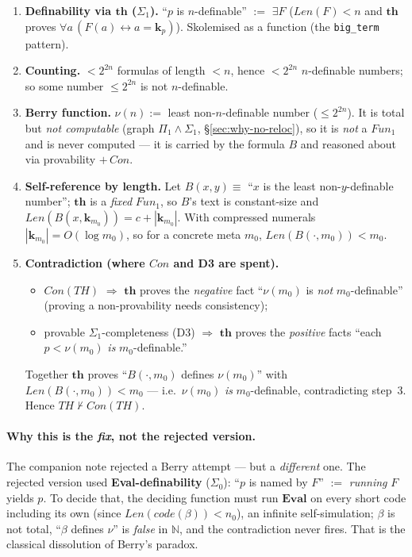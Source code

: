 \documentclass[11pt]{article}
\theoremstyle{plain}
\theoremstyle{definition}
\theoremstyle{remark}
\newcommand{\code}[1]{\mathit{code}(#1)}
\newcommand{\Con}{\mathit{Con}}
\newcommand{\Fun}{\mathit{Fun}}
\newcommand{\Len}{\mathit{Len}}
\newcommand{\Thy}{\mathit{TH}}
\newcommand{\thmT}{\mathbf{th}}
\newcommand{\Eval}{\mathbf{Eval}}
\begin{document}
\begin{enumerate}
\item \textbf{Definability via $\thmT$ ($\Sigma_1$).}  ``$p$ is
  $n$-definable'' $:=$ $\exists F$ ($\Len(F)<n$ and $\thmT$ proves
  $\forall a\,(F(a)\leftrightarrow a=\mathbf{k}_p)$).  Skolemised as a
  function (the \texttt{big\_term} pattern).
\item \textbf{Counting.}  $<2^{2n}$ formulas of length $<n$, hence
  $<2^{2n}$ $n$-definable numbers; so some number $\le 2^{2n}$ is not
  $n$-definable.
\item \textbf{Berry function.}  $\nu(n) := $ least non-$n$-definable
  number ($\le 2^{2n}$).  It is total but \emph{not computable} (graph
  $\Pi_1\wedge\Sigma_1$, {\S}\ref{sec:why-no-reloc}), so it is \emph{not}
  a $\Fun_1$ and is never computed --- it is carried by the formula $B$
  and reasoned about via provability $+\,\Con$.
\item \textbf{Self-reference by length.}  Let $B(x,y)\equiv$ ``$x$ is the
  least non-$y$-definable number''; $\thmT$ is a \emph{fixed} $\Fun_1$,
  so $B$'s text is constant-size and $\Len(B(x,\mathbf{k}_{m_0})) =
  c + |\mathbf{k}_{m_0}|$.  With compressed numerals $|\mathbf{k}_{m_0}| =
  O(\log m_0)$, so for a concrete meta $m_0$, $\Len(B(\cdot,m_0))<m_0$.
\item \textbf{Contradiction (where $\Con$ and D3 are spent).}
  \begin{itemize}
  \item $\Con(\Thy)$ $\Rightarrow$ $\thmT$ proves the \emph{negative}
    fact ``$\nu(m_0)$ is \emph{not} $m_0$-definable'' (proving a
    non-provability needs consistency);
  \item provable $\Sigma_1$-completeness (D3) $\Rightarrow$ $\thmT$ proves
    the \emph{positive} facts ``each $p<\nu(m_0)$ \emph{is}
    $m_0$-definable.''
  \end{itemize}
  Together $\thmT$ proves ``$B(\cdot,m_0)$ defines $\nu(m_0)$'' with
  $\Len(B(\cdot,m_0))<m_0$ --- i.e.\ $\nu(m_0)$ \emph{is}
  $m_0$-definable, contradicting step~3.  Hence $\Thy\not\vdash\Con(\Thy)$.
\end{enumerate}

\paragraph{Why this is the \emph{fix}, not the rejected version.}  The
companion note rejected a Berry attempt --- but a \emph{different} one.
The rejected version used \textbf{Eval-definability} ($\Sigma_0$): ``$p$
is named by $F$'' $:=$ \emph{running} $F$ yields $p$.  To decide that,
the deciding function must run $\Eval$ on every short code including its
own (since $\Len(\code\beta)<n_0$), an infinite self-simulation; $\beta$
is not total, ``$\beta$ defines $\nu$'' is \emph{false} in $\mathbb N$,
and the contradiction never fires.  That is the classical dissolution of
Berry's paradox.
\end{document}
